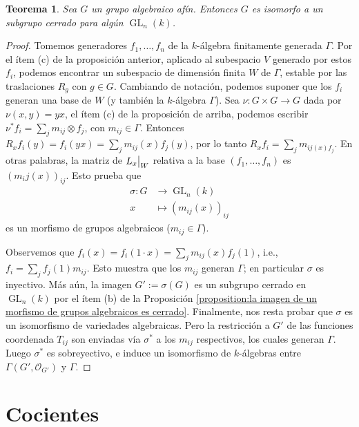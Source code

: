 \documentclass[spanish,10pt]{amsart}
\newtheorem{theorem}{Teorema}[section]
\theoremstyle{definition}
\theoremstyle{remark}
\numberwithin{equation}{section}
\newcommand\rest[2]{{%
  \left.\kern-\nulldelimiterspace %
  #1 %
  \vphantom{\big|} %
  \right|_{#2} %
  }}
\renewcommand{\O}{\mathcal{O}}
\begin{document}
\begin{theorem}\label{th:todo grupo algebraico afin es isomorfo a un subgrupo cerrado de GLn}
Sea $G$ un grupo algebraico afín. Entonces $G$ es isomorfo a un subgrupo cerrado para algún $\operatorname{GL}_n (k)$.
\end{theorem}
\begin{proof}
Tomemos generadores $f_1, \ldots, f_n$ de la $k$-álgebra finitamente generada $\Gamma$. Por el ítem (c) de la proposición anterior, aplicado al subespacio $V$ generado por estos $f_i$, podemos encontrar un subespacio de dimensión finita $W$ de $\Gamma$, estable por las traslaciones $R_g$ con $g \in G$. Cambiando de notación, podemos suponer que los $f_i$ generan una base de $W$ (y también la $k$-álgebra $\Gamma$). Sea $\nu : G \times G \to G$ dada por $\nu (x,y) = yx$, el ítem (c) de la proposición de arriba, podemos escribir $\nu^* f_i = \sum_{j} m_{ij} \otimes f_j$, con $m_{ij} \in \Gamma$. Entonces $R_x f_i (y) = f_i (y x) = \sum_j m_{ij} (x) f_j (y)$, por lo tanto $R_x f_i = \sum_j m_{ij (x) f_j}$. En otras palabras, la matriz de $\rest{L_x} W$ relativa a la base $(f_1, \ldots,f_n)$ es $(m_ij (x))_{ij}$. Esto prueba que
\begin{align*}
    \sigma : G &\longrightarrow \operatorname{GL}_n (k) \\
    x &\longmapsto (m_{ij} (x))_{ij}
\end{align*}
es un morfismo de grupos algebraicos ($m_{ij} \in \Gamma$).

Observemos que $f_i (x) = f_i (1 \cdot x) = \sum_{j} m_{ij} (x) f_j (1)$, i.e., $f_i = \sum_j f_j (1) m_{ij}$. Esto muestra que los $m_{ij}$ generan $\Gamma$; en particular $\sigma$ es inyectivo. Más aún, la imagen $G' := \sigma (G)$ es un subgrupo cerrado en $\operatorname{GL}_n (k)$ por el ítem (b) de la Proposición \ref{proposition:la imagen de un morfismo de grupos algebraicos es cerrado}. Finalmente, nos resta probar que $\sigma$ es un isomorfismo de variedades algebraicas. Pero la restricción a $G'$ de las funciones coordenada $T_{ij}$ son enviadas vía $\sigma^*$ a los $m_{ij}$ respectivos, los cuales generan $\Gamma$. Luego $\sigma^*$ es sobreyectivo, e induce un isomorfismo de $k$-álgebras entre $\Gamma (G', \O_{G'})$ y $\Gamma$.
\end{proof}


\section{Cocientes}
\end{document}
